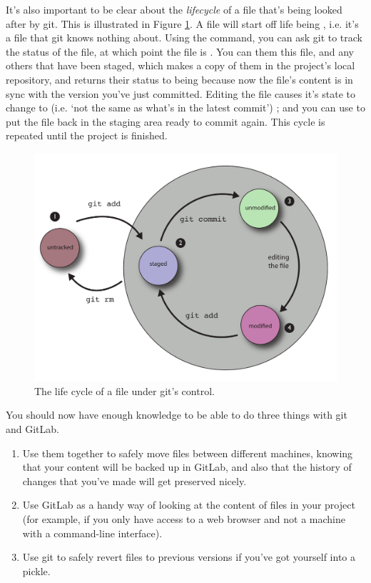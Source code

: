 It's also important to be clear about the \emph{lifecycle} of a file that's being looked after by git. This is illustrated in Figure \ref{figure:git-file-life-cycle}. A file \protect{} will start off life being , i.e. it's a file that git knows nothing about. Using the  command, you can ask git to track the status of the file, at which point the file is  \protect{}. You can them  this file, and any others that have been staged, which makes a copy of them in the project's local repository, and returns their status to being  \protect{} because now the file's content is in sync with the version you've just committed. Editing the file causes it's state to change to  (i.e. `not the same as what's in the latest commit') \protect{}; and you can use  to put the file back in the staging area ready to commit again. This cycle is repeated until the project is finished. 



\begin{figure}
\centerline{\includegraphics[width=15cm]{images/git-file-life-cycle}}
\caption{The life cycle of a file under git's control.}\label{figure:git-file-life-cycle}
\end{figure}

You should now have enough knowledge to be able to do three things with git and GitLab.

\begin{enumerate}
\item Use them together to safely move files between different machines, knowing that your content will be backed up in GitLab, and also that the history of changes that you've made will get preserved nicely.
\item Use GitLab as a handy way of looking at the content of files in your project (for example, if you only have access to a web browser and not a machine with a command-line interface).
\item Use git to safely revert files to previous versions if you've got yourself into a pickle. 
\end{enumerate}

